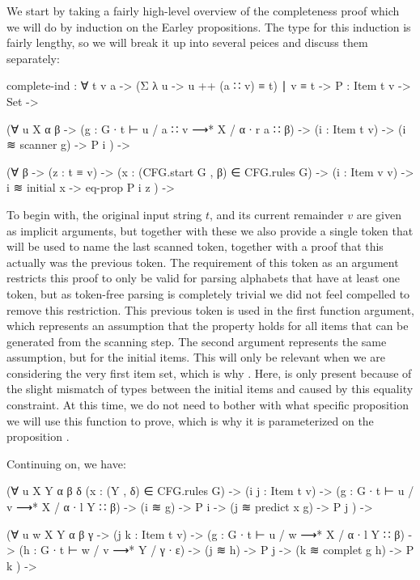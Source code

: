 		We start by taking a fairly high-level overview of the completeness
		proof which we will do by induction on the Earley propositions. The
		type for this induction is fairly lengthy, so we will break it up into
		several peices and discuss them separately:

		\begin{code}
			complete-ind : ∀ {t v a} ->
			  (Σ λ u -> u ++ (a ∷ v) ≡ t) ∣ v ≡ t ->
			  {P : Item t v -> Set} ->

			  (∀ {u X α β} ->
			    (g : G ∙ t ⊢ u / a ∷ v ⟶* X / α ∙ r a ∷ β) ->
			    (i : Item t v) -> (i ≋ scanner g) ->
			    P i
			  ) ->

			  (∀ {β} ->
			    (z : t ≡ v) ->
			    (x : (CFG.start G , β) ∈ CFG.rules G) ->
			    (i : Item v v) ->
			    i ≋ initial x -> eq-prop P i z
			  ) ->
		\end{code}

		To begin with, the original input string $t$, and its current remainder
		$v$ are given as implicit arguments, but together with these we also
		provide a single token that will be used to name the last scanned
		token, together with a proof that this actually was the previous token.
		The requirement of this token as an argument restricts this proof to
		only be valid for parsing alphabets that have at least one token, but
		as token-free parsing is completely trivial we did not feel compelled
		to remove this restriction. This previous token is used in the first
		function argument, which represents an assumption that the property
		 holds for all items that can be generated from the scanning
		step. The second argument represents the same assumption, but for the
		initial items. This will only be relevant when we are considering the
		very first item set, which is why . Here,
		 is only present because of the slight mismatch of
		types between the initial items and  caused by this equality
		constraint. At this time, we do not need to bother with what specific
		proposition we will use this function to prove, which is why it is 
		parameterized on the proposition .

		Continuing on, we have:

		\begin{code}
			  (∀ {u X Y α β δ} (x : (Y , δ) ∈ CFG.rules G) ->
			    (i j : Item t v) ->
			    (g : G ∙ t ⊢ u / v ⟶* X / α ∙ l Y ∷ β) ->
			    (i ≋ g) -> P i ->
			    (j ≋ predict x g) -> P j
			  ) ->

			  (∀ {u w X Y α β γ} ->
			    (j k : Item t v) ->
			    (g : G ∙ t ⊢ u / w ⟶* X / α ∙ l Y ∷ β) ->
			    (h : G ∙ t ⊢ w / v ⟶* Y / γ ∙ ε) ->
			    (j ≋ h) -> P j ->
			    (k ≋ complet g h) -> P k
			  ) ->
		\end{code}

